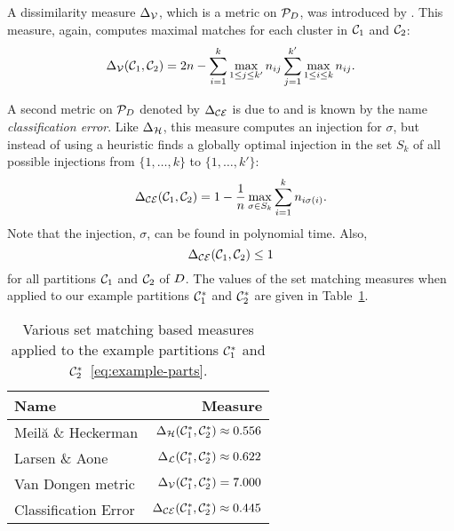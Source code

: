 A dissimilarity measure $\Delta_{\mathcal{V}}$, which is a metric on
$\mathcal{P}_{D}$, was introduced by \citet{van-dongen-2000}.  This measure,
again, computes maximal matches for each cluster in $\mathcal{C}_1$ and $\mathcal{C}_2$:
\begin{equation*}
  \Delta_{\mathcal{V}}(\mathcal{C}_1,\mathcal{C}_2) = 2n - \sum_{i=1}^{k} \max_{1 \leq j \leq k'} n_{ij}
                         \sum_{j=1}^{k'} \max_{1 \leq i \leq k} n_{ij}.
\end{equation*}

A second metric on $\mathcal{P}_{D}$ denoted by $\Delta_{\mathcal{CE}}$ is due to
\citet{meila-2005} and is known by the name \textit{classification error}.
Like $\Delta_{\mathcal{H}}$, this measure computes an injection for $\sigma$, but
instead of using a heuristic finds a globally optimal injection in the set
$S_k$ of all possible injections from $\{1,\dotsc,k\}$ to $\{1,\dotsc,k'\}$:
\begin{equation*}
  \Delta_{\mathcal{CE}}(\mathcal{C}_1,\mathcal{C}_2) = 1 - \frac{1}{n} \max_{\sigma \in S_k}
                                     \sum_{i=1}^{k} n_{i \sigma(i)}.
\end{equation*}
Note that the injection, $\sigma$, can be found in polynomial time.  Also,
\[\Delta_{\mathcal{CE}}(\mathcal{C}_1,\mathcal{C}_2) \leq 1\] for all partitions $\mathcal{C}_1$ and $\mathcal{C}_2$ of
$D$.  The values of the set matching measures when applied to our example
partitions $\mathcal{C}^*_1$ and $\mathcal{C}^*_2$ are given in
Table~\ref{tab:set-matching-comparison}.

\begin{table}
  \centering
  \begin{tabular}{lr}
    \toprule
    Name & Measure \\
    \midrule
    Meilă \& Heckerman   & $\Delta_{\mathcal{H}}(\mathcal{C}^*_1,\mathcal{C}^*_2) \approx 0.556$ \\
    Larsen \& Aone       & $\Delta_{\mathcal{L}}(\mathcal{C}^*_1,\mathcal{C}^*_2) \approx 0.622$ \\
    Van Dongen metric    & $\Delta_{\mathcal{V}}(\mathcal{C}^*_1,\mathcal{C}^*_2) = 7.000$ \\
    Classification Error & $\Delta_{\mathcal{CE}}(\mathcal{C}^*_1,\mathcal{C}^*_2) \approx 0.445$ \\
    
    \bottomrule
  \end{tabular}
  \caption{Various set matching based measures applied to the example
    partitions $\mathcal{C}^*_1$ and $\mathcal{C}^*_2$~\eqref{eq:example-parts}.}
  \label{tab:set-matching-comparison}
\end{table}

